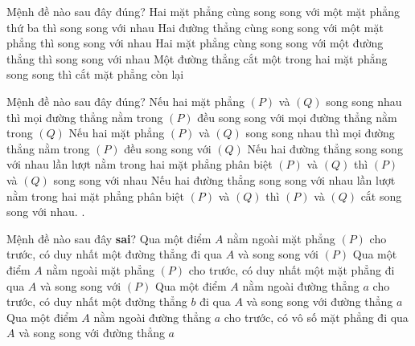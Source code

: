 \begin{ex}%
	Mệnh đề nào sau đây đúng?
	\choice
	{ Hai mặt phẳng cùng song song với một mặt phẳng thứ ba thì song song với nhau}
	{Hai đường thẳng cùng song song với một mặt phẳng thì song song với nhau}
	{Hai mặt phẳng cùng song song với một đường thẳng thì song song với nhau}
	{\True Một đường thẳng cắt một trong hai mặt phẳng song song thì cắt mặt phẳng còn lại}
\end{ex}
\begin{ex}%
	Mệnh đề nào sau đây đúng?
	\choice 
	{ Nếu hai mặt phẳng $(P)$ và $(Q)$ song song nhau thì mọi đường thẳng nằm trong $(P)$ đều song song với mọi đường thẳng nằm trong $(Q)$} 
	{\True Nếu hai mặt phẳng $(P)$ và $(Q)$ song song nhau thì mọi đường thẳng nằm trong $(P)$ đều song song với $(Q)$} 
	{ Nếu hai đường thẳng song song với nhau lần lượt nằm trong hai mặt phẳng phân biệt $(P)$ và $(Q)$ thì $(P)$ và $(Q)$ song song với nhau} 
	{ Nếu hai đường thẳng song song với nhau lần lượt nằm trong hai mặt phẳng phân biệt $(P)$ và $(Q)$ thì $(P)$ và $(Q)$ cắt song song với nhau.}
	.		 
\end{ex} 
\begin{ex}%
	Mệnh đề nào sau đây \textbf{sai}?
	\choice
	{\True Qua một điểm $A$ nằm ngoài mặt phẳng $(P)$ cho trước, có duy nhất một đường thẳng đi qua $A$ và song song với $(P)$} 
	{ Qua một điểm $A$ nằm ngoài mặt phẳng $(P)$ cho trước, có duy nhất một mặt phẳng đi qua $A$ và song song với $(P)$} 
	{ Qua một điểm $A$ nằm ngoài đường thẳng $a$ cho trước, có duy nhất một đường thẳng $b$ đi qua $A$ và song song với đường thẳng $a$} 
	{ Qua một điểm $A$ nằm ngoài đường thẳng $a$ cho trước, có vô số mặt phẳng đi qua $A$ và song song với đường thẳng $a$}
\end{ex} 
